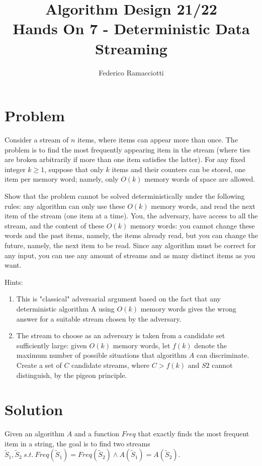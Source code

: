 \documentclass{article}
\title{\LARGE{\textbf{Algorithm Design 21/22}}\\ \vspace{1cm} Hands On 7 - Deterministic Data Streaming}
\author{Federico Ramacciotti}
\date{}
\begin{document}
\maketitle

\section{Problem}
Consider a stream of $n$ items, where items can appear more than once. The problem is to find the most frequently appearing item in the stream (where ties are broken arbitrarily if more than one item satisfies the latter). For any fixed integer $k \geq 1$, suppose that only $k$ items and their counters can be stored, one item per memory word; namely, only $O(k)$ memory words of space are allowed. 

Show that the problem cannot be solved deterministically under the following rules: any algorithm can only use these $O(k)$ memory words, and read the next item of the stream (one item at a time). You, the adversary, have access to all the stream, and the content of these $O(k)$ memory words: you cannot change these words and the past items, namely, the items already read, but you can change the future, namely, the next item to be read. Since any algorithm must be correct for any input, you can use any amount of streams and as many distinct items as you want.

Hints:
\begin{enumerate}
    \item This is "classical" adversarial argument based on the fact that any deterministic algorithm A using $O(k)$ memory words gives the wrong answer for a suitable stream chosen by the adversary. 
    \item The stream to choose as an adversary is taken from a candidate set sufficiently large: given $O(k)$ memory words, let $f(k)$ denote the maximum number of possible situations that algorithm $A$ can discriminate. Create a set of $C$ candidate streams, where $C > f(k)$ and $S2$ cannot distinguish, by the pigeon principle.
\end{enumerate}

\section{Solution}
Given an algorithm $A$ and a function $Freq$ that exactly finds the most frequent item in a string, the goal is to find two streams $\tilde S_1,\tilde S_2\ s.t.\ Freq(\tilde S_1)=Freq(\tilde S_2) \land A(\tilde S_1)=A(\tilde S_2)$.
\end{document}
